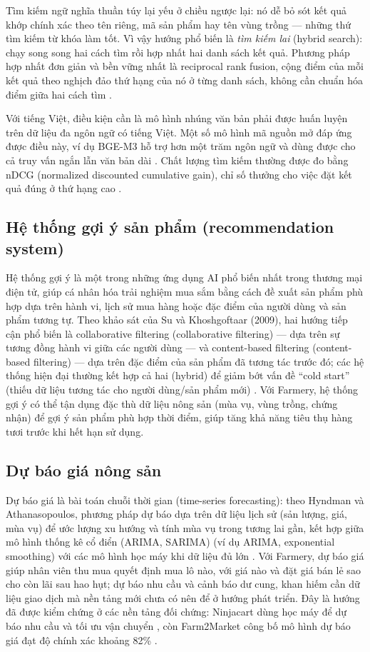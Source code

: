 Tìm kiếm ngữ nghĩa thuần túy lại yếu ở chiều ngược lại: nó dễ bỏ sót kết quả khớp chính xác theo tên riêng, mã sản phẩm hay tên vùng trồng --- những thứ tìm kiếm từ khóa làm tốt. Vì vậy hướng phổ biến là \emph{tìm kiếm lai} (hybrid search): chạy song song hai cách tìm rồi hợp nhất hai danh sách kết quả. Phương pháp hợp nhất đơn giản và bền vững nhất là reciprocal rank fusion, cộng điểm của mỗi kết quả theo nghịch đảo thứ hạng của nó ở từng danh sách, không cần chuẩn hóa điểm giữa hai cách tìm \parencite{cormack2009rrf}.

Với tiếng Việt, điều kiện cần là mô hình nhúng văn bản phải được huấn luyện trên dữ liệu đa ngôn ngữ có tiếng Việt. Một số mô hình mã nguồn mở đáp ứng được điều này, ví dụ BGE-M3 hỗ trợ hơn một trăm ngôn ngữ và dùng được cho cả truy vấn ngắn lẫn văn bản dài \parencite{chen2024bgem3}. Chất lượng tìm kiếm thường được đo bằng nDCG (normalized discounted cumulative gain), chỉ số thưởng cho việc đặt kết quả đúng ở thứ hạng cao \parencite{jarvelin2002ndcg}.

\subsection{Hệ thống gợi ý sản phẩm (recommendation system)}
Hệ thống gợi ý là một trong những ứng dụng AI phổ biến nhất trong thương mại điện tử, giúp cá nhân hóa trải nghiệm mua sắm bằng cách đề xuất sản phẩm phù hợp dựa trên hành vi, lịch sử mua hàng hoặc đặc điểm của người dùng và sản phẩm tương tự. Theo khảo sát của Su và Khoshgoftaar (2009), hai hướng tiếp cận phổ biến là collaborative filtering (collaborative filtering) --- dựa trên sự tương đồng hành vi giữa các người dùng --- và content-based filtering (content-based filtering) --- dựa trên đặc điểm của sản phẩm đã tương tác trước đó; các hệ thống hiện đại thường kết hợp cả hai (hybrid) để giảm bớt vấn đề ``cold start'' (thiếu dữ liệu tương tác cho người dùng/sản phẩm mới) \parencite{su2009collaborative}. Với Farmery, hệ thống gợi ý có thể tận dụng đặc thù dữ liệu nông sản (mùa vụ, vùng trồng, chứng nhận) để gợi ý sản phẩm phù hợp thời điểm, giúp tăng khả năng tiêu thụ hàng tươi trước khi hết hạn sử dụng.

\subsection{Dự báo giá nông sản}
Dự báo giá là bài toán chuỗi thời gian (time-series forecasting): theo Hyndman và Athanasopoulos, phương pháp dự báo dựa trên dữ liệu lịch sử (sản lượng, giá, mùa vụ) để ước lượng xu hướng và tính mùa vụ trong tương lai gần, kết hợp giữa mô hình thống kê cổ điển (ARIMA, SARIMA) (ví dụ ARIMA, exponential smoothing) với các mô hình học máy khi dữ liệu đủ lớn \parencite{hyndman2021forecasting}. Với Farmery, dự báo giá giúp nhân viên thu mua quyết định mua lô nào, với giá nào và đặt giá bán lẻ sao cho còn lãi sau hao hụt; dự báo nhu cầu và cảnh báo dư cung, khan hiếm cần dữ liệu giao dịch mà nền tảng mới chưa có nên để ở hướng phát triển. Đây là hướng đã được kiểm chứng ở các nền tảng đối chứng: Ninjacart dùng học máy để dự báo nhu cầu và tối ưu vận chuyển \parencite{ninjacart}, còn Farm2Market công bố mô hình dự báo giá đạt độ chính xác khoảng 82\% \parencite{farm2market_2025}.

